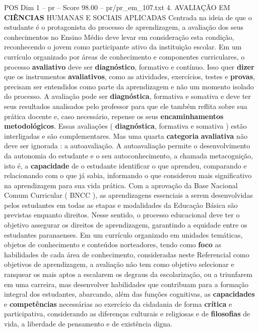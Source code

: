 \begin{textsample}{POS Dim 1 – pr – Score 98.00 – pr/pr\_em\_107.txt}  \label{ex:f1_pos_023}
4.
AVALIAÇÃO EM \textbf{CIÊNCIAS} HUMANAS E SOCIAIS APLICADAS Centrada na ideia de que o estudante é o protagonista do processo de aprendizagem, a avaliação dos seus conhecimentos no Ensino Médio deve levar em consideração esta condição, reconhecendo o jovem como participante ativo da instituição escolar.
Em um currículo organizado por áreas de conhecimento e componentes curriculares, o processo \textbf{avaliativo} deve ser \textbf{diagnóstico}, formativo e contínuo.
Isso quer \textbf{dizer} que os instrumentos \textbf{avaliativos}, como as atividades, exercícios, testes e \textbf{provas}, precisam ser entendidos como parte da aprendizagem e não um momento isolado do processo.
A avaliação pode ser \textbf{diagnóstica}, formativa e somativa e deve ter seus resultados analisados pelo professor para que ele também reflita sobre sua prática docente e, caso necessário, repense os seus \textbf{encaminhamentos} \textbf{metodológicos}.
Essas avaliações ( \textbf{diagnóstica}, formativa e somativa ) estão interligadas e são complementares.
Mas uma quarta \textbf{categoria} \textbf{avaliativa} não deve ser ignorada : a autoavaliação.
A autoavaliação permite o desenvolvimento da autonomia do estudante e o seu autoconhecimento, a chamada metacognição, isto é, a \textbf{capacidade} de o estudante identificar o que aprendeu, comparando e relacionando com o que já sabia, informando o que considerou mais significativo na aprendizagem para sua vida prática.
Com a aprovação da Base Nacional Comum Curricular ( BNCC ), as aprendizagens essenciais a serem desenvolvidas pelos estudantes em todas as etapas e modalidades da Educação Básica são previstas enquanto direitos.
Nesse sentido, o processo educacional deve ter o objetivo assegurar os direitos de aprendizagem, garantindo a equidade entre os estudantes paranaenses.
Em um currículo organizado em unidades temáticas, objetos de conhecimento e conteúdos norteadores, tendo como \textbf{foco} as habilidades de cada área de conhecimento, consideradas neste Referencial como objetivos de aprendizagem, a avaliação não tem como objetivo selecionar e ranquear os mais aptos a escalarem os degraus da escolarização, ou a triunfarem em uma carreira, mas desenvolver habilidades que contribuam para a formação integral dos estudantes, abarcando, além das funções cognitivas, as \textbf{capacidades} e \textbf{competências} necessárias ao exercício da cidadania de forma \textbf{crítica} e participativa, considerando as diferenças culturais e religiosas e de \textbf{filosofias} de vida, a liberdade de pensamento e de existência digna.

\end{textsample}
